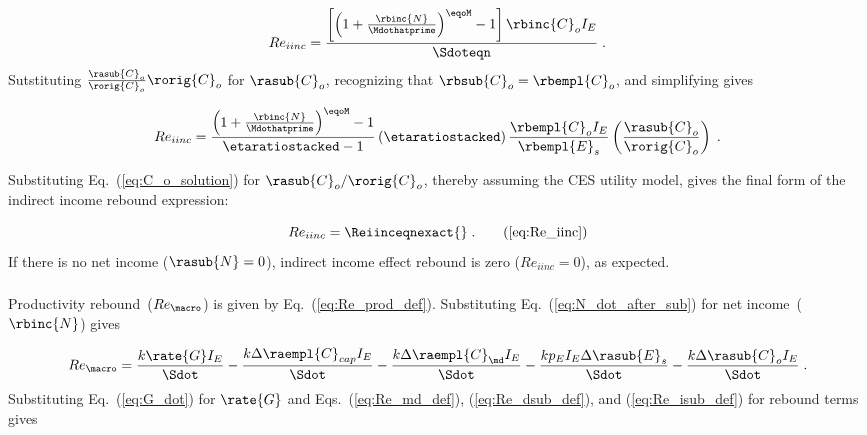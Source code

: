 \begin{equation}
  Re_{iinc} = \frac{\left[ \left( 1 + \frac{\rbinc{N}}{\Mdothatprime} \right)^{\eqoM} - 1  \right] 
              \rbinc{C}_o I_E}{\Sdoteqn} \; .
\end{equation}
%
Sutstituting $\frac{\rasub{C}_o}{\rorig{C}_o} \rorig{C}_o$ for $\rasub{C}_o$,  
recognizing that $\rbsub{C}_o = \rbempl{C}_o$, and simplifying gives 

\begin{equation}
  Re_{iinc} = \frac{\left( 1 + \frac{\rbinc{N}}{\Mdothatprime} \right)^{\eqoM} - 1}{\etaratiostacked - 1} 
              \left( \etaratiostacked \right)
              \frac{\rbempl{C}_o I_E}{\rbempl{E}_s}
              \left( \frac{\rasub{C}_o}{\rorig{C}_o} \right) \; .
\end{equation}

Substituting Eq.~(\ref{eq:C_o_solution}) 
for $\rasub{C}_o / \rorig{C}_o$, 
thereby assuming the CES utility model,
gives the final form 
of the indirect income rebound expression:

\begin{equation}
  Re_{iinc} = \Reiinceqnexact{} \; . \tag{\ref{eq:Re_iinc}}
\end{equation}
%
If there is no net income ($\rasub{N} = 0$), 
indirect income effect rebound is zero ($Re_{iinc} = 0$), as expected.


\subsubsection{\Prodeffect{}} 
\label{sec:Re_prod}

Productivity rebound~($Re_{\macro}$) is given by Eq.~(\ref{eq:Re_prod_def}).
Substituting Eq.~(\ref{eq:N_dot_after_sub}) for net income~($\rbinc{N}$) gives

\begin{equation}
  Re_{\macro} = \frac{k \rate{G} I_E}{\Sdot}
                                - \frac{k \Delta \raempl{C}_{cap} I_E}{\Sdot}
                                - \frac{k \Delta \raempl{C}_{\md} I_E}{\Sdot}
                                - \frac{k p_E I_E \Delta \rasub{E}_s}{\Sdot}
                                - \frac{k \Delta \rasub{C}_o I_E}{\Sdot} \; .
\end{equation}
%
Substituting Eq.~(\ref{eq:G_dot}) for $\rate{G}$
and Eqs.~(\ref{eq:Re_md_def}), (\ref{eq:Re_dsub_def}), and (\ref{eq:Re_isub_def})
for rebound terms gives

